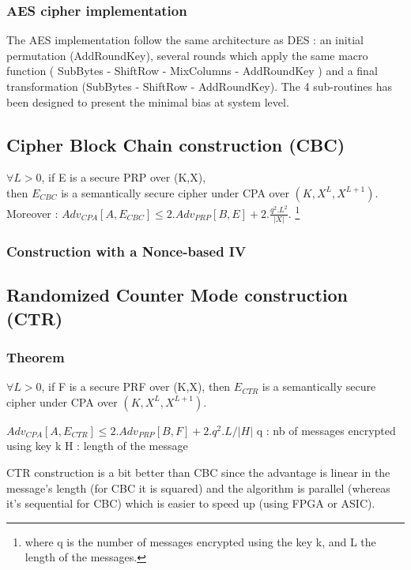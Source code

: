 \subsubsection{ AES cipher implementation }

The AES implementation follow the same architecture as DES : an initial permutation (AddRoundKey), several rounds which apply the same macro function ( SubBytes - ShiftRow - MixColumns - AddRoundKey ) and a final transformation (SubBytes - ShiftRow - AddRoundKey). The 4 sub-routines has been designed to present the minimal bias at system level.

\subsection{Cipher Block Chain construction (CBC)}



\begin{mytheorem}
   $\forall L>0$, if E is a secure PRP over (K,X), \\
   then $E_{CBC}$ is a semantically secure cipher under CPA over $(K,X^L,X^{L+1})$. \\
 	Moreover : $Adv_{CPA}[A,E_{CBC}] \leq 2.Adv_{PRP}[B,E] + 2.\frac{q^2.L^2}{|X|} $. \footnote{where q is the number of messages encrypted using the key k, and L the length of the messages.}
\end{mytheorem}

\subsubsection{Construction with a Nonce-based IV}

\subsection{Randomized Counter Mode construction (CTR)}


\subsubsection{Theorem}

$\forall L>0$, if F is a secure PRF over (K,X), then $E_{CTR}$ is a semantically secure cipher under CPA over $(K,X^L,X^{L+1})$.

$Adv_{CPA}[A,E_{CTR}] \leq 2.Adv_{PRP}[B,F] + 2.q^2.L/|H| $
q : nb of messages encrypted using key k
H : length of the message

CTR construction is a bit better than CBC since the advantage is linear in the message's length (for CBC it is squared) and the algorithm is parallel (whereas it's sequential for CBC) which is easier to speed up (using FPGA or ASIC).





